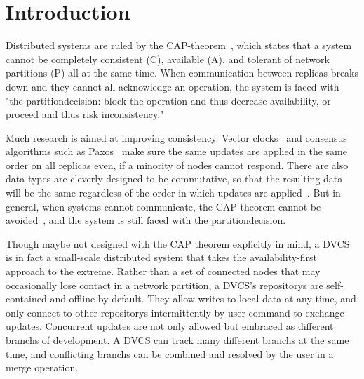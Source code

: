 \section{Introduction}


Distributed systems are ruled by the \gls{CAP-theorem}~\cite{cap_origin}, which states that a system cannot be completely consistent (C), available (A), and tolerant of network partitions (P) all at the same time.
When communication between replicas breaks down and they cannot all acknowledge an operation, the system is faced with "the \gls{partitiondecision}: block the operation and thus decrease availability, or proceed and thus risk inconsistency."~\cite{cap_years_later}

Much research is aimed at improving consistency.
Vector clocks~\cite{lamport_ordering} and consensus algorithms such as Paxos~\cite{paxos_made_simple,paxos_made_moderately_complex} make sure the same updates are applied in the same order on all replicas even, if a minority of nodes cannot respond.
There are also data types are cleverly designed to be commutative, so that the resulting data will be the same regardless of the order in which updates are applied~\cite{crdt_orig}.
But in general, when systems cannot communicate, the CAP theorem cannot be avoided~\cite{cap_proof}, and the system is still faced with the \gls{partitiondecision}.


Though maybe not designed with the CAP theorem explicitly in mind, a \gls{DVCS} is in fact a small-scale distributed system that takes the availability-first approach to the extreme.
Rather than a set of connected nodes that may occasionally lose contact in a network partition, a \gls{DVCS}'s \glspl{repository} are self-contained and offline by default.
They allow writes to local data at any time, and only connect to other \glspl{repository} intermittently by user command to exchange updates.
Concurrent updates are not only allowed but embraced as different \glspl{branch} of development.
A \gls{DVCS} can track many different \glspl{branch} at the same time, and conflicting \glspl{branch} can be combined and resolved by the user in a \gls{merge} operation.

